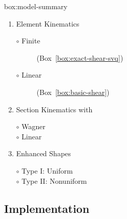 \begin{ambox}{box:model-summary}


\begin{enumerate}
    \item Element Kinematics
        \begin{description}
            \item[$\circ$ Finite] (Box~\ref{box:exact-shear-svq})
            \item[$\circ$ Linear] (Box~\ref{box:basic-shear})
        \end{description}
    \item Section Kinematics 
        with
        \begin{description}
            \item[$\circ$ Wagner] 
            \item[$\circ$ Linear] 
        \end{description}

    \item Enhanced Shapes
     \begin{description}
        \item[$\circ$ Type I: Uniform] 
        \item[$\circ$ Type II: Nonuniform]
     \end{description}

\end{enumerate}
\end{ambox}


\subsection{Implementation}

